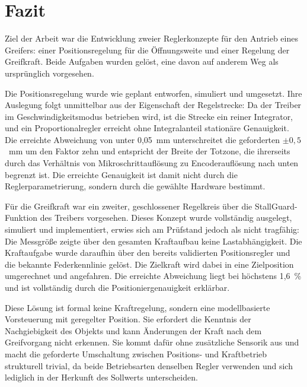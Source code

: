 \label{chap:fazit}

\section{Fazit}

Ziel der Arbeit war die Entwicklung zweier Reglerkonzepte für den Antrieb eines
Greifers: einer Positionsregelung für die Öffnungsweite und einer Regelung der Greifkraft.
Beide Aufgaben wurden gelöst, eine davon auf anderem Weg als ursprünglich vorgesehen.

Die Positionsregelung wurde wie geplant entworfen, simuliert und umgesetzt. Ihre
Auslegung folgt unmittelbar aus der Eigenschaft der Regelstrecke: Da der Treiber im
Geschwindigkeitsmodus betrieben wird, ist die Strecke ein reiner Integrator, und ein
Proportionalregler erreicht ohne Integralanteil stationäre Genauigkeit. Die erreichte
Abweichung von unter 0,05~mm unterschreitet die geforderten $\pm 0{,}5$~mm um den Faktor
zehn und entspricht der Breite der Totzone, die ihrerseits durch das Verhältnis von
Mikroschrittauflösung zu Encoderauflösung nach unten begrenzt ist. Die erreichte
Genauigkeit ist damit nicht durch die Reglerparametrierung, sondern durch die gewählte
Hardware bestimmt.

Für die Greifkraft war ein zweiter, geschlossener Regelkreis über die StallGuard-Funktion
des Treibers vorgesehen. Dieses Konzept wurde vollständig ausgelegt, simuliert und
implementiert, erwies sich am Prüfstand jedoch als nicht tragfähig: Die Messgröße zeigte
über den gesamten Kraftaufbau keine Lastabhängigkeit. Die Kraftaufgabe wurde daraufhin
über den bereits validierten Positionsregler und die bekannte Federkennlinie gelöst. Die
Zielkraft wird dabei in eine Zielposition umgerechnet und angefahren. Die erreichte
Abweichung liegt bei höchstens 1,6~\% und ist vollständig durch die Positioniergenauigkeit
erklärbar.

Diese Lösung ist formal keine Kraftregelung, sondern eine modellbasierte Vorsteuerung mit
geregelter Position. Sie erfordert die Kenntnis der Nachgiebigkeit des Objekts und kann
Änderungen der Kraft nach dem Greifvorgang nicht erkennen. Sie kommt dafür ohne
zusätzliche Sensorik aus und macht die geforderte Umschaltung zwischen Positions- und
Kraftbetrieb strukturell trivial, da beide Betriebsarten denselben Regler verwenden und
sich lediglich in der Herkunft des Sollwerts unterscheiden.

